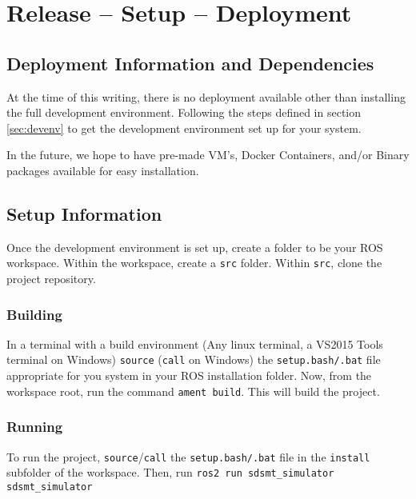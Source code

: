 
\chapter{Release -- Setup -- Deployment}
\section{Deployment Information and Dependencies}
At the time of this writing, there is no deployment available other than installing the full development environment. Following the steps defined in section \ref{sec:devenv} to get the development environment set up for your system.

In the future, we hope to have pre-made VM's, Docker Containers, and/or Binary packages available for easy installation.

\section{Setup Information}
Once the development environment is set up, create a folder to be your ROS workspace. Within the workspace, create a \lstinline|src| folder. Within \lstinline|src|, clone the project repository.

\subsection*{Building}
In a terminal with a build environment (Any linux terminal, a VS2015 Tools terminal on Windows) \lstinline|source| (\lstinline|call| on Windows) the \lstinline|setup.bash/.bat| file appropriate for you system in your ROS installation folder. Now, from the workspace root, run the command \lstinline|ament build|. This will build the project.

\subsection*{Running}
To run the project, \lstinline|source|/\lstinline|call| the \lstinline|setup.bash/.bat| file in the \lstinline|install| subfolder of the workspace. Then, run \lstinline|ros2 run sdsmt_simulator sdsmt_simulator|